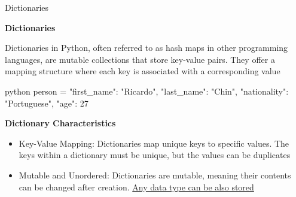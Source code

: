 \documentclass[
	11pt, 
]{beamer}
\begin{document}

\begin{frame}[fragile]{Dictionaries}
    \scriptsize
\begin{block}{\textbf{Dictionaries}}
    
Dictionaries in Python, often referred to as hash maps in other programming languages, are mutable collections that store key-value pairs. They offer a mapping structure where each key is associated with a corresponding value

\end{block}

\begin{mintedbox}{python}
person = {  "first_name": "Ricardo",
            "last_name": "Chin",
            "nationality": "Portuguese",
            "age": 27            }
\end{mintedbox}

\begin{exampleblock}{\textbf{Dictionary Characteristics}}
    \begin{itemize}
        \item Key-Value Mapping: Dictionaries map unique keys to specific values. The keys within a dictionary must be unique, but the values can be duplicates
        \item Mutable and Unordered: Dictionaries are mutable, meaning their contents can be changed after creation. \underline{Any data type can be also stored}
    \end{itemize}    
\end{exampleblock}
    
\end{frame}


\end{document}
